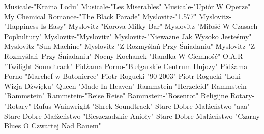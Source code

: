 \documentclass{article}
\begin{document}
{ Musicale-"Kraina Lodu"   \newline
 Musicale-"Les Miserables"   \newline
 Musicale-"Upiór W Operze"   \newline
 My Chemical Romance-"The Black Parade"   \newline
 Myslovitz-"1.577"   \newline
 Myslovitz-"Happiness Is Easy"   \newline
 Myslovitz-"Korova Milky Bar"   \newline
 Myslovitz-"Miłość W Czasach Popkultury"   \newline
 Myslovitz-"Myslovitz"   \newline
 Myslovitz-"Nieważne Jak Wysoko Jesteśmy"   \newline
 Myslovitz-"Sun Machine"   \newline
 Myslovitz-"Z Rozmyślań Przy Śniadaniu"   \newline
 Myslovitz-"Z Rozmyślań Przy Śniadaniu"   \newline
 Nocny Kochanek-"Randka W Ciemność"   \newline
 O.A.R-"Twilight Soundtrack"   \newline
 Pidżama Porno-"Bułgarskie Centrum Hujozy"   \newline
 Pidżama Porno-"Marchef w Butonierce"   \newline
 Piotr Rogucki-"90-2003"   \newline
 Piotr Rogucki-"Loki - Wizja Dżwięku"   \newline
 Queen-"Made In Heaven"   \newline
 Rammstein-"Herzeleid"   \newline
 Rammstein-"Rammstein"   \newline
 Rammstein-"Reise Reise"   \newline
 Rammstein-"Rosenrot"   \newline
 Religijne   \newline
 Rotary-"Rotary"   \newline
 Rufus Wainwright-"Shrek Soundtrack"   \newline
 Stare Dobre Małżeństwo-"aaa"   \newline
 Stare Dobre Małżeństwo-"Bieszczadzkie Anioły"   \newline
 Stare Dobre Małżeństwo-"Czarny Blues O Czwartej Nad Ranem"   \newline
}
\end{document}
